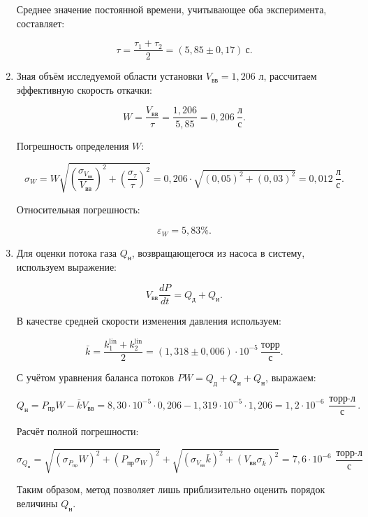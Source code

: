 \documentclass[a4paper,12pt]{article}
\begin{document}
\begin{enumerate}
    Среднее значение постоянной времени, учитывающее оба эксперимента, составляет:
    
    \[
        \tau = \frac{\tau_1 + \tau_2}{2} = (5{,}85 \pm 0{,}17) \ \text{с}.
    \]
    
    \item Зная объём исследуемой области установки $V_{\text{вв}} = 1{,}206$ л, рассчитаем эффективную скорость откачки:
    
    \[
        W = \frac{V_{\text{вв}}}{\tau} = \frac{1{,}206}{5{,}85} = 0{,}206 \ \frac{\text{л}}{\text{с}}.
    \]
    
    Погрешность определения $W$:
    
    \[
        \sigma_W =  W \sqrt{\left(\frac{\sigma_{V_\text{вв}}}{V_\text{вв}}\right)^2 +\left(\frac{\sigma_{\tau}}{\tau}\right)^2} = 0{,}206 \cdot \sqrt{\left( 0{,}05\right)^2 + \left(0{,}03\right)^2} = 0{,}012 \ \frac{\text{л}}{\text{с}}.
    \]
    
    Относительная погрешность:
    
    \[
        \varepsilon_W =  5{,}83\%.
    \]
    
    \item Для оценки потока газа $Q_{\text{н}}$, возвращающегося из насоса в систему, используем выражение:
    
    \[
        V_{\text{вв}} \frac{dP}{dt} = Q_\text{д} + Q_\text{и}.
    \]
    
    В качестве средней скорости изменения давления используем:
    
    \[
        \bar{k} = \frac{k_1^{\text{lin}} + k_2^{\text{lin}}}{2} = (1{,}318 \pm 0{,}006) \cdot 10^{-5} \ \frac{\text{торр}}{\text{с}}.
    \]
    
    С учётом уравнения баланса потоков $PW = Q_\text{д} + Q_\text{и} + Q_\text{н}$, выражаем:
    
    \[
        Q_\text{н} = P_{\text{пр}} W - \bar{k} V_{\text{вв}} = 8{,}30 \cdot 10^{-5} \cdot 0{,}206 - 1{,}319 \cdot 10^{-5} \cdot 1{,}206 = 1{,}2 \cdot 10^{-6} \ \frac{\text{торр} \cdot \text{л}}{\text{с}}.
    \]
    
    Расчёт полной погрешности:
    
    \[
        \sigma_{Q_\text{н}} = \sqrt{(\sigma_{P_{\text{пр}}} W)^2 + (P_{\text{пр}} \sigma_W)^2} + \sqrt{(\sigma_{V_{\text{вв}}} \bar{k})^2 + (V_{\text{вв}} \sigma_{\bar{k}})^2} = 7,6 \cdot 10^{-6} \ \frac{\text{торр} \cdot \text{л}}{\text{с}}
    \]
    
    Таким образом, метод позволяет лишь приблизительно оценить порядок величины $Q_{\text{н}}$.


    
   \end{enumerate}
\end{document}
